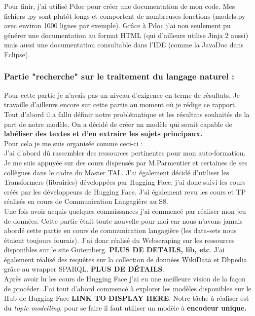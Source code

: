 \documentclass[12pt]{article}
\begin{document}
Pour finir, j'ai utilisé Pdoc pour créer une documentation de mon code. Mes fichiers .py sont plutôt longs et comportent de nombreuses fonctions (models.py avec environ 1000 lignes par exemple). Grâce à Pdoc j'ai non seulement pu générer une documentation au format HTML (qui d'ailleurs utilise Jinja 2 aussi) mais aussi une documentation consultable dans l'IDE (comme la JavaDoc dans Eclipse).


\subsubsection{Partie "recherche" sur le traitement du langage naturel :}

Pour cette partie je n'avais pas un niveau d'exigence en terme de résultats. Je travaille d'ailleurs encore sur cette partie au moment où je rédige ce rapport. \\
Tout d'abord il a fallu définir notre problématique et les résultats souhaités de la part de notre modèle. On a décidé de créer un modèle qui serait capable de \textbf{labéliser des textes et d'en extraire les sujets principaux.} \\

Pour cela je me suis organisée comme ceci-ci : \\
J'ai d'abord dû rassembler des ressources pertinentes pour mon auto-formation. Je me suis appuyée sur des cours dispensés par M.Parmentier et certaines de ses collègues dans le cadre du Master TAL. J'ai également décidé d'utiliser les Transformers (librairies) développées par Hugging Face, j'ai donc suivi les cours créés par les développeurs de Hugging Face. J'ai également revu les cours et TP réalisés en cours de Communication Langagière au S8. \\

Une fois avoir acquis quelques connaissances j'ai commencé par réaliser mon jeu de données. Cette partie était toute nouvelle pour moi car nous n'avons jamais abordé cette partie en cours de communication langagière (les data-sets nous étaient toujours fournis). J'ai donc réalisé du Webscraping sur les ressources disponibles sur le site Gutemberg. \textbf{PLUS DE DETAILS, lib, etc}. 
J'ai également réalisé des requêtes sur la collection de données WikiData et Dbpedia grâce au wrapper SPARQL. \textbf{PLUS DE DÉTAILS}. \\

Après avoir lu les cours de Hugging Face j'ai eu une meilleure vision de la façon de procéder. J'ai tout d'abord commencé à explorer les modèles disponibles sur le Hub de Hugging Face \textbf{LINK TO DISPLAY HERE}. Notre tâche à réaliser est du \textit{topic modelling}, pour se faire il faut utiliser un modèle à \textbf{encodeur unique.} 
\end{document}
